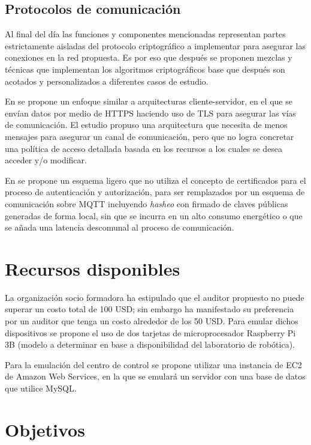 \documentclass{article}
\begin{document}
        \subsection{Protocolos de comunicación}

            Al final del día las funciones y componentes mencionadas representan partes estrictamente aisladas del protocolo criptográfico a implementar para asegurar las conexiones en la red propuesta. Es por eso que después se proponen mezclas y técnicas que implementan los algoritmos criptográficos base que después son acotados y personalizados a diferentes casos de estudio.

            En \cite{abreu2020identity} se propone un enfoque similar a arquitecturas cliente-servidor, en el que se envían datos por medio de HTTPS haciendo uso de TLS para asegurar las vías de comunicación. El estudio propuso una arquitectura que necesita de menos mensajes para asegurar un canal de comunicación, pero que no logra concretar una política de acceso  detallada basada en los recursos a los cuales se desea acceder y/o modificar.

            En \cite{lohachab2019ecc} se propone un esquema ligero que no utiliza el concepto de certificados para el proceso de autenticación y autorización, para ser remplazados por un esquema de comunicación sobre MQTT incluyendo \textit{hasheo} con firmado de claves públicas generadas de forma local, sin que se incurra en un alto consumo energético o que se añada una latencia descomunal al proceso de comunicación.

    \section{Recursos disponibles}

        La organización socio formadora ha estipulado que el auditor propuesto no puede superar un costo total de 100 USD; sin embargo ha manifestado su preferencia por un auditor que tenga un costo alrededor de los 50 USD. Para emular dichos dispositivos se propone el uso de dos tarjetas de microprocesador Raspberry Pi 3B
        (modelo a determinar en base a disponibilidad del laboratorio de robótica).

        Para la emulación del centro de control se propone utilizar una instancia de EC2 de Amazon Web Services, en la que se emulará un servidor con una base de datos que utilice MySQL.

    \section{Objetivos}
\end{document}
